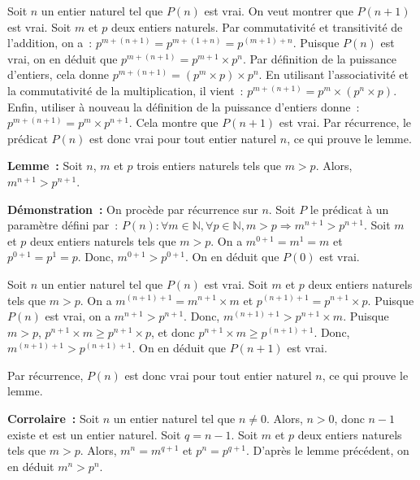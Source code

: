     Soit $n$ un entier naturel tel que $P(n)$ est vrai. 
    On veut montrer que $P(n+1)$ est vrai. 
    Soit $m$ et $p$ deux entiers naturels. 
    Par commutativité et transitivité de l'addition, on a : $p^{m+(n+1)} = p^{m+(1+n)} = p^{(m+1)+n}$. 
    Puisque $P(n)$ est vrai, on en déduit que $p^{m+(n+1)} = p^{m+1} \times p^n$. 
    Par définition de la puissance d'entiers, cela donne $p^{m+(n+1)} = (p^m \times p) \times p^n$. 
    En utilisant l'associativité et la commutativité de la multiplication, il vient : $p^{m+(n+1)} = p^m \times (p^n \times p)$. 
    Enfin, utiliser à nouveau la définition de la puissance d'entiers donne : $p^{m+(n+1)} = p^m \times p^{n+1}$. 
    Cela montre que $P(n+1)$ est vrai. 
    Par récurrence, le prédicat $P(n)$ est donc vrai pour tout entier naturel $n$, ce qui prouve le lemme. 

   \done 

\medskip

\noindent\textbf{Lemme :} Soit $n$, $m$ et $p$ trois entiers naturels tels que $m > p$. 
    Alors, $m^{n+1} > p^{n+1}$. 

\medskip

\noindent\textbf{Démonstration :} On procède par récurrence sur $n$. 
    Soit $P$ le prédicat à un paramètre défini par : $P(n): \forall m \in \mathbb{N}, \forall p \in \mathbb{N}, m > p \Rightarrow m^{n+1} > p^{n+1}$. 
    Soit $m$ et $p$ deux entiers naturels tels que $m > p$. 
    On a $m^{0+1} = m^1 = m$ et $p^{0+1} = p^1 = p$. 
    Donc, $m^{0+1} > p^{0+1}$. 
    On en déduit que $P(0)$ est vrai.

    Soit $n$ un entier naturel tel que $P(n)$ est vrai. 
    Soit $m$ et $p$ deux entiers naturels tels que $m > p$. 
    On a $m^{(n+1)+1} = m^{n+1} \times m$ et $p^{(n+1)+1} = p^{n+1} \times p$. 
    Puisque $P(n)$ est vrai, on a $m^{n+1} > p^{n+1}$. 
    Donc, $m^{(n+1)+1} > p^{n+1} \times m$. 
    Puisque $m > p$, $p^{n+1} \times m \geq p^{n+1} \times p$, et donc $p^{n+1} \times m \geq p^{(n+1)+1}$. 
    Donc, $m^{(n+1)+1} > p^{(n+1)+1}$. 
    On en déduit que $P(n+1)$ est vrai. 

    Par récurrence, $P(n)$ est donc vrai pour tout entier naturel $n$, ce qui prouve le lemme.

   \done 

\medskip

\noindent\textbf{Corrolaire :} 
    Soit $n$ un entier naturel tel que $n \neq 0$. 
    Alors, $n > 0$, donc $n - 1$ existe et est un entier naturel.
    Soit $q = n - 1$. 
    Soit $m$ et $p$ deux entiers naturels tels que $m > p$.
    Alors, $m^n = m^{q+1}$ et $p^n = p^{q+1}$. 
    D'après le lemme précédent, on en déduit $m^n > p^n$. 

